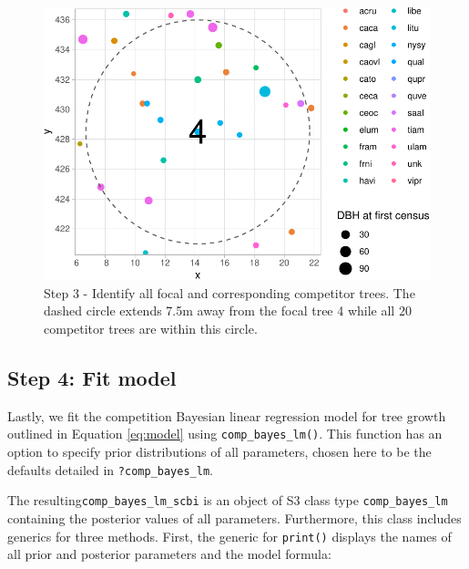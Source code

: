 \documentclass[12pt]{article}
\newenvironment{Shaded}{\begin{snugshade}}{\end{snugshade}}
\newcommand{\DataTypeTok}[1]{\textcolor[rgb]{0.13,0.29,0.53}{#1}}
\newcommand{\KeywordTok}[1]{\textcolor[rgb]{0.13,0.29,0.53}{\textbf{#1}}}
\newcommand{\NormalTok}[1]{#1}
\newcommand{\OperatorTok}[1]{\textcolor[rgb]{0.81,0.36,0.00}{\textbf{#1}}}
\newcommand{\OtherTok}[1]{\textcolor[rgb]{0.56,0.35,0.01}{#1}}
\newcommand{\StringTok}[1]{\textcolor[rgb]{0.31,0.60,0.02}{#1}}
\begin{document}
\begin{figure}

{\centering \includegraphics[width=0.66\linewidth]{Figures/scbi-focal-vs-comp-map-1} 

}

\caption{Step 3 - Identify all focal and corresponding competitor trees. The dashed circle extends 7.5m away from the focal tree 4 while all 20 competitor trees are within this circle.}\label{fig:scbi-focal-vs-comp-map}
\end{figure}

\hypertarget{model-fit-predict}{%
\subsection{Step 4: Fit model}\label{model-fit-predict}}

Lastly, we fit the competition Bayesian linear regression model for tree
growth outlined in Equation \ref{eq:model} using
\texttt{comp\_bayes\_lm()}. This function has an option to specify prior
distributions of all parameters, chosen here to be the defaults detailed
in \texttt{?comp\_bayes\_lm}.

\begin{Shaded}
\end{Shaded}

The resulting\texttt{comp\_bayes\_lm\_scbi} is an object of S3 class
type \texttt{comp\_bayes\_lm} containing the posterior values of all
parameters. Furthermore, this class includes generics for three methods.
First, the generic for \texttt{print()} displays the names of all prior
and posterior parameters and the model formula:
\end{document}
